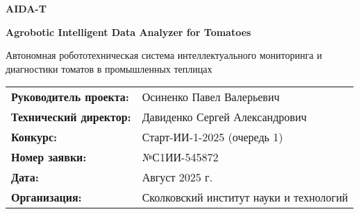 \begin{frame}[plain]
    \centering
    \vspace{1cm}
    
    {\Huge \textcolor{aiblue}{\textbf{AIDA-T}}}
    \vspace{0.3cm}
    
    {\Large \textcolor{aigreen}{\textbf{Agrobotic Intelligent Data Analyzer for Tomatoes}}}
    \vspace{0.5cm}
    
    {\large Автономная робототехническая система интеллектуального мониторинга и диагностики томатов в промышленных теплицах}
    \vspace{1cm}
    
    \vspace{0.8cm}
    
    \begin{tabular}{ll}
    \textbf{Руководитель проекта:} & Осиненко Павел Валерьевич \\
    \textbf{Технический директор:} & Давиденко Сергей Александрович \\
    \textbf{Конкурс:} & Старт-ИИ-1-2025 (очередь 1) \\
    \textbf{Номер заявки:} & №С1ИИ-545872 \\
    \textbf{Дата:} & Август 2025 г. \\
    \textbf{Организация:} & Сколковский институт науки и технологий
    \end{tabular}
    
    \end{frame}